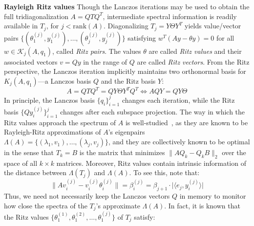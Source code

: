 \documentclass[10pt]{article}
\numberwithin{equation}{section}
\newcommand{\+}{%
	\raisebox{0.18ex}{\scaleobj{0.55}{+}}
}
\theoremstyle{definition}
\begin{document}

\textbf{Rayleigh Ritz values}
Though the Lanczos iterations may be used to obtain the full tridiagonalization $A = Q T Q^T$,  intermediate spectral information is readily available in $T_j$, for $j < \mathrm{rank}(A)$.
Diagonalizing $T_j = Y \Theta Y^T$ yields value/vector pairs $\{  (\theta_1^{(j)}, y_1^{(j)}), \dots, (\theta_j^{(j)}, y_j^{(j)}) \}$ satisfying $w^T (Ay - \theta y) = 0$ for all $w \in \mathcal{K}_j(A, q_1)$, called \emph{Ritz pairs}. The values $\theta$ are called \emph{Ritz values} and their associated vectors $v = Q y$ in the range of $Q$ are called \emph{Ritz vectors}.
From the Ritz perspective, the Lanczos iteration implicitly maintains two orthonormal basis for $K_j(A, q_1)$---a Lanczos basis $Q$ and the Ritz basis $Y$:
$$ A = Q T Q^T = Q Y \Theta Y^T Q^T \Longleftrightarrow A Q Y = Q Y \Theta $$
In principle, the Lanczos basis $\{q_i\}_{i=1}^j$ changes each iteration, while the Ritz basis $\{ Q y_i^{(j)} \}_{i=1}^{j}$ changes after each subspace projection. The way in which the Ritz values approach the spectrum of $A$ is well-studied~\cite{}, as they are known to be Rayleigh-Ritz approximations of $A$'s eigenpairs $\Lambda(A) = \{  (\lambda_1, v_1), \dots, (\lambda_j, v_j) \}$, and they are collectively known to be optimal in the sense that $T_k = B$ is the matrix that minimizes $\lVert A Q_k - Q_k B \rVert_2$ over the space of all $k \times k$ matrices. 
Moreover, Ritz values contain intrinsic information of the distance between $\Lambda(T_j)$ and $\Lambda(A)$. To see this, note that: 
\begin{equation}
	\lVert A v_i^{(j)} - v_i^{(j)} \theta_i^{(j)} \rVert = \beta_i^{(j)} = \beta_{j+1} \cdot \lvert \langle e_j, y_i^{(j)} \rangle   \rvert 
\end{equation}
Thus, we need not necessarily keep the Lanczos vectors $Q$ in memory to monitor how close the spectra of the $T_j$'s approximate $\Lambda(A)$. In fact, it is known that the Ritz values $\{ \theta_1^{(1)}, \theta_1^{(2)}, \dots, \theta_1^{(j)} \}$ of $T_j$ satisfy: 
\end{document}
